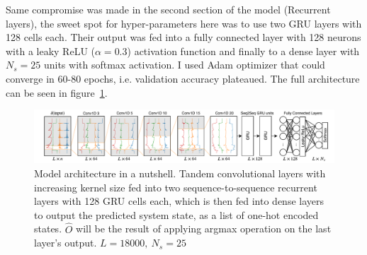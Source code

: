 Same compromise was made in the second section of the model (Recurrent layers), the sweet spot for hyper-parameters here was to use two GRU layers with 128 cells each. Their output was fed into a fully connected layer with 128 neurons with a leaky ReLU ($\alpha=0.3$) activation function \cite{maas2013rectifier} and finally to a dense layer with $N_s=25$ units with softmax activation.
I used Adam optimizer \cite{kingma2014adam} that could converge in 60-80 epochs, i.e. validation accuracy plateaued. The full architecture can be seen in figure~\ref{fig:model_arch}.
\begin{landscape}
\begin{figure}
    \centering
    \includegraphics[width=\columnwidth]{ASE_files/Convolutional_Net.pdf}
    \caption{Model architecture in a nutshell. Tandem convolutional layers with increasing kernel size fed into two sequence-to-sequence recurrent layers with 128 GRU cells each, which is then fed into dense layers to output the predicted system state, as a list of one-hot encoded states. $\hat{O}$ will be the result of applying argmax operation on the last layer's output. $L=18000,\: N_s=25$}
    \label{fig:model_arch}
\end{figure}
\end{landscape}